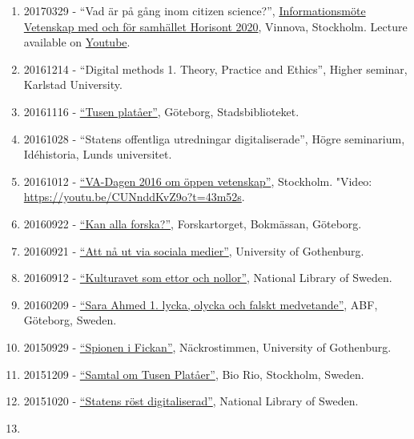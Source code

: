 \documentclass[
]{article}
\begin{document}
\begin{enumerate}
{  Göteborgs Universitet}.
\item
  20170329 - ``Vad är på gång inom citizen science?'',
  \href{http://www.vinnova.se/sv/Aktuellt--publicerat/Kalendarium/2017/170329-Informationsmote-Vetenskap-med-och-for-samhallet/}{Informationsmöte
  Vetenskap med och för samhället Horisont 2020}, Vinnova, Stockholm.
  Lecture available on \href{https://youtu.be/HHW0j7Zo5E0}{Youtube}.
\item
  20161214 - ``Digital methods 1. Theory, Practice and Ethics'', Higher
  seminar, Karlstad University.
\item
  20161116 -
  \href{http://www.stadsbiblioteket.nu/tusen-plataer/}{``Tusen
  platåer''}, Göteborg, Stadsbiblioteket.
\item
  20161028 - ``Statens offentliga utredningar digitaliserade'', Högre
  seminarium, Idéhistoria, Lunds universitet.
\item
  20161012 - \href{https://v-a.se/events/va-dagen-2016/}{``VA-Dagen 2016
  om öppen vetenskap''}, Stockholm. "Video:
  \url{https://youtu.be/CUNnddKvZ9o?t=43m52s}.
\item
  20160922 -
  \href{http://flov.gu.se/aktuellt/Nyheter/fulltext//sju-filosofer-forelaser-pa-bokmassan-.cid1403852}{``Kan
  alla forska?''}, Forskartorget, Bokmässan, Göteborg.
\item
  20160921 -
  \href{http://kompetensutveckling.adm.gu.se/seminar/detail/2260}{``Att
  nå ut via sociala medier''}, University of Gothenburg.
\item
  20160912 -
  \href{http://www.kb.se/aktuellt/utbildningar/2016/Kulturarvet-som-ettor-och-nollor--Del-3-Digital-humaniora/}{``Kulturavet
  som ettor och nollor''}, National Library of Sweden.
\item
  20160209 -
  \href{http://www.abfgoteborg.org/index.php/archive/2016/170-filosofiscenen-2016/2208-sarah-ahmed-lycka-och-falskt-medvetande}{``Sara
  Ahmed 1. lycka, olycka och falskt medvetande''}, ABF, Göteborg,
  Sweden.
\item
  20150929 -
  \href{http://hum.gu.se/aktuellt/Nyheter/fulltext//nackrostimmen--spionen-i-fickan-som-overvakar-oss.cid1324880}{``Spionen
  i Fickan''}, Näckrostimmen, University of Gothenburg.
\item
  20151209 - \href{http://fhp.nu/tusenplataer}{``Samtal om Tusen
  Platåer''}, Bio Rio, Stockholm, Sweden.
\item
  20151020 -
  \href{http://www.kb.se/aktuellt/evenemang/2015/SOUhack/}{``Statens
  röst digitaliserad''}, National Library of Sweden.
\item

\end{enumerate}
\end{document}
